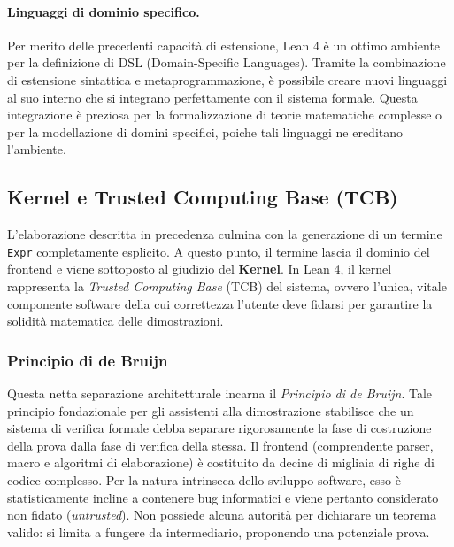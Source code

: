 \paragraph{Linguaggi di dominio specifico.}
Per merito delle precedenti capacità di estensione, Lean 4 è un ottimo ambiente per la definizione di DSL (Domain-Specific Languages). Tramite la combinazione di estensione sintattica e metaprogrammazione, 
è possibile creare nuovi linguaggi al suo interno che si integrano perfettamente con il sistema formale. Questa integrazione è preziosa per la formalizzazione di teorie matematiche complesse o per la 
modellazione di domini specifici, poiche tali linguaggi ne ereditano l'ambiente.

\subsection{Kernel e Trusted Computing Base (TCB)}
L'elaborazione descritta in precedenza culmina con la generazione di un termine \texttt{Expr} completamente esplicito. A questo punto, il termine lascia il dominio del frontend 
e viene sottoposto al giudizio del \textbf{Kernel}. In Lean 4, il kernel rappresenta la \textit{Trusted Computing Base} (TCB) del sistema, ovvero l'unica, vitale componente software 
della cui correttezza l'utente deve fidarsi per garantire la solidità matematica delle dimostrazioni.

\subsubsection{Principio di de Bruijn}
Questa netta separazione architetturale incarna il \emph{Principio di de Bruijn}. Tale principio fondazionale per gli assistenti alla dimostrazione stabilisce che un sistema di verifica 
formale debba separare rigorosamente la fase di costruzione della prova dalla fase di verifica della stessa. Il frontend (comprendente parser, macro e algoritmi di elaborazione) è costituito 
da decine di migliaia di righe di codice complesso. Per la natura intrinseca dello sviluppo software, esso è statisticamente incline a contenere bug informatici e viene pertanto considerato 
non fidato (\textit{untrusted}). Non possiede alcuna autorità per dichiarare un teorema valido: si limita a fungere da intermediario, proponendo una potenziale prova.


